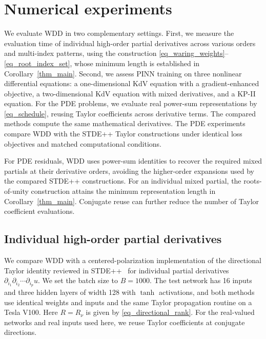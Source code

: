 \documentclass[final,oneeqnum]{siamltex}
\begin{document}
\FloatBarrier
\section{Numerical experiments}\label{sec_experiments}

We evaluate WDD in two complementary settings.
First, we measure the evaluation time of individual high-order partial derivatives across various orders and multi-index patterns, using the construction \eqref{eq_waring_weights}--\eqref{eq_root_index_set}, whose minimum length is established in Corollary~\ref{thm_main}.
Second, we assess PINN training on three nonlinear differential equations: a one-dimensional KdV equation with a gradient-enhanced objective, a two-dimensional KdV equation with mixed derivatives, and a KP-II equation.
For the PDE problems, we evaluate real power-sum representations by \eqref{eq_schedule}, reusing Taylor coefficients across derivative terms.
The compared methods compute the same mathematical derivatives.
The PDE experiments compare WDD with the STDE++ Taylor constructions under identical loss objectives and matched computational conditions.

For PDE residuals, WDD uses power-sum identities to recover the required mixed partials at their derivative orders, avoiding the higher-order expansions used by the compared STDE++ constructions.
For an individual mixed partial, the roots-of-unity construction attains the minimum representation length in Corollary~\ref{thm_main}.
Conjugate reuse can further reduce the number of Taylor coefficient evaluations.

\subsection{Individual high-order partial derivatives}\label{sec_num_problems}

We compare WDD with a centered-polarization implementation of the directional Taylor identity reviewed in STDE++~\cite[Section~6.1, Eq.~(25)]{Shi2026stdepp} for individual partial derivatives $\partial_{i_1} \partial_{i_2} \cdots \partial_{i_p} u$.
We set the batch size to $B = 1000$.
The test network has 16 inputs and three hidden layers of width 128 with $\tanh$ activations, and both methods use identical weights and inputs and the same Taylor propagation routine on a Tesla V100.
Here $R = R_\nu$ is given by \eqref{eq_directional_rank}.
For the real-valued networks and real inputs used here, we reuse Taylor coefficients at conjugate directions.
\end{document}
